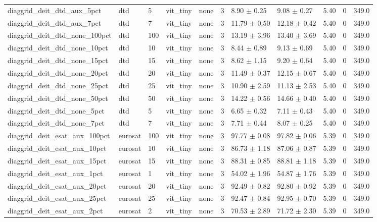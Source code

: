 \begin{tabular}{lllllllllll}
diaggrid_deit_dtd_aux_5pct & dtd & 5 & vit_tiny & none & 3 & 8.90 $\pm$ 0.25 & 9.08 $\pm$ 0.27 & 5.40 & 0 & 349.0 \\
diaggrid_deit_dtd_aux_7pct & dtd & 7 & vit_tiny & none & 3 & 11.79 $\pm$ 0.50 & 12.18 $\pm$ 0.42 & 5.40 & 0 & 349.0 \\
diaggrid_deit_dtd_none_100pct & dtd & 100 & vit_tiny & none & 3 & 13.19 $\pm$ 3.96 & 13.40 $\pm$ 3.69 & 5.40 & 0 & 349.0 \\
diaggrid_deit_dtd_none_10pct & dtd & 10 & vit_tiny & none & 3 & 8.44 $\pm$ 0.89 & 9.13 $\pm$ 0.69 & 5.40 & 0 & 349.0 \\
diaggrid_deit_dtd_none_15pct & dtd & 15 & vit_tiny & none & 3 & 8.62 $\pm$ 1.15 & 9.20 $\pm$ 0.64 & 5.40 & 0 & 349.0 \\
diaggrid_deit_dtd_none_20pct & dtd & 20 & vit_tiny & none & 3 & 11.49 $\pm$ 0.37 & 12.15 $\pm$ 0.67 & 5.40 & 0 & 349.0 \\
diaggrid_deit_dtd_none_25pct & dtd & 25 & vit_tiny & none & 3 & 10.90 $\pm$ 2.59 & 11.13 $\pm$ 2.53 & 5.40 & 0 & 349.0 \\
diaggrid_deit_dtd_none_50pct & dtd & 50 & vit_tiny & none & 3 & 14.22 $\pm$ 0.56 & 14.66 $\pm$ 0.40 & 5.40 & 0 & 349.0 \\
diaggrid_deit_dtd_none_5pct & dtd & 5 & vit_tiny & none & 3 & 6.65 $\pm$ 0.32 & 7.11 $\pm$ 0.43 & 5.40 & 0 & 349.0 \\
diaggrid_deit_dtd_none_7pct & dtd & 7 & vit_tiny & none & 3 & 7.71 $\pm$ 0.44 & 8.07 $\pm$ 0.25 & 5.40 & 0 & 349.0 \\
diaggrid_deit_esat_aux_100pct & eurosat & 100 & vit_tiny & none & 3 & 97.77 $\pm$ 0.08 & 97.82 $\pm$ 0.06 & 5.39 & 0 & 349.0 \\
diaggrid_deit_esat_aux_10pct & eurosat & 10 & vit_tiny & none & 3 & 86.73 $\pm$ 1.18 & 87.06 $\pm$ 0.87 & 5.39 & 0 & 349.0 \\
diaggrid_deit_esat_aux_15pct & eurosat & 15 & vit_tiny & none & 3 & 88.31 $\pm$ 0.85 & 88.81 $\pm$ 1.18 & 5.39 & 0 & 349.0 \\
diaggrid_deit_esat_aux_1pct & eurosat & 1 & vit_tiny & none & 3 & 54.02 $\pm$ 1.96 & 54.87 $\pm$ 1.76 & 5.39 & 0 & 349.0 \\
diaggrid_deit_esat_aux_20pct & eurosat & 20 & vit_tiny & none & 3 & 92.49 $\pm$ 0.82 & 92.80 $\pm$ 0.92 & 5.39 & 0 & 349.0 \\
diaggrid_deit_esat_aux_25pct & eurosat & 25 & vit_tiny & none & 3 & 92.47 $\pm$ 0.84 & 92.95 $\pm$ 0.70 & 5.39 & 0 & 349.0 \\
diaggrid_deit_esat_aux_2pct & eurosat & 2 & vit_tiny & none & 3 & 70.53 $\pm$ 2.89 & 71.72 $\pm$ 2.30 & 5.39 & 0 & 349.0 \\

\end{tabular}
